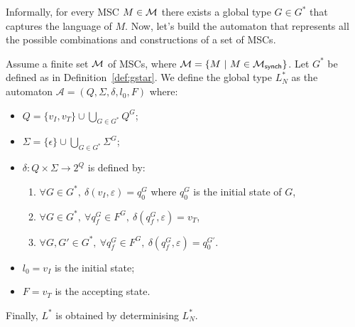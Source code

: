 Informally, for every MSC $M\in\mathcal{M}$ there exists a global type $G\in G^*$ that
captures the language of $M$. Now, let's build the automaton that represents
all the possible combinations and constructions of a set of MSCs.

\bigskip

\begin{definition}\label{def:lstar}
	Assume a finite set $\mathcal{M}$ of MSCs, where
	$\mathcal{M} = \{M\ |\ M \in \mathcal{M}_{\mathsf{synch}}\}$. Let $G^*$
	be defined as in Definition~\ref{def:gstar}.
	We define the global type $L^*_{N}$ as the automaton
	$\mathcal A = (Q,\Sigma, \delta, l_0, F)$ where:
	\begin{itemize}
		\item $Q = \{v_I,v_T\}\cup \bigcup_{G\in G^*} Q^G$;
		\item $\Sigma = \{\epsilon\}\cup\bigcup_{G\in G^*} \Sigma^G$;
		\item $\delta: Q \times \Sigma \rightarrow 2^Q$ is defined by:
			      \begin{enumerate}
				       \item $\forall G \in G^*,\ \delta(v_I, \varepsilon) = q_0^G$ where $q_0^G$ is the initial state of $G$,
				       \item $\forall G \in G^*,\ \forall q_f^G \in F^G,\ \delta(q_f^G, \varepsilon) = v_T$,
				       \item $\forall G, G' \in G^*,\ \forall q_f^G \in F^G,\ \delta(q_f^G, \varepsilon) = q_0^{G'}$.
			      \end{enumerate}
		\item $l_0 = v_I$ is the initial state;
		\item $F = v_T$ is the accepting state.
	\end{itemize}
	Finally, $L^*$ is obtained by determinising $L^*_{N}$.
\end{definition}

